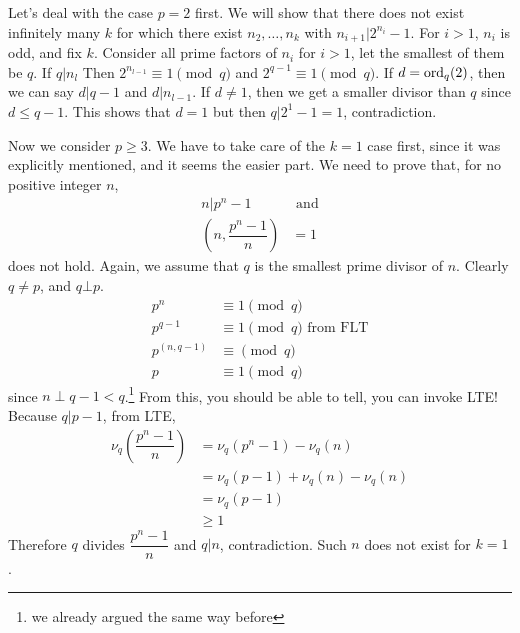 \documentclass[problems.tex]{subfile}
\begin{document}
	\begin{solution}
		Let's deal with the case $p=2$ first. We will show that there does not exist infinitely many $k$ for which there exist $n_2,\ldots,n_k$ with $n_{i+1}|2^{n_i}-1$. For $i>1$, $n_i$ is odd, and fix $k$. Consider all prime factors of $n_i$ for $i>1$, let the smallest of them be $q$. If $q|n_{l}$ Then $2^{n_{l-1}}\equiv1\pmod q$ and $2^{q-1}\equiv1\pmod q$. If $d=\operatorname{ord}_q(2)$, then we can say $d|q-1$ and $d|n_{l-1}$. If $d\neq1$, then we get a smaller divisor than $q$ since $d\leq q-1$. This shows that $d=1$ but then $q|2^1-1=1$, contradiction.
		
		Now we consider $p\geq3$. We have to take care of the $k=1$ case first, since it was explicitly mentioned, and it seems the easier part. We need to prove that, for no positive integer $n$,
			\begin{align*}
				n  |p^n-1 & \text{ and}\\
				\left(n,\dfrac{p^n-1}{n}\right) & = 1
			\end{align*}
		does not hold. Again, we assume that $q$ is the smallest prime divisor of $n$. Clearly $q\neq p$, and $q\bot p$.
			\begin{align*}
				p^n & \equiv1\pmod q\\
				p^{q-1}& \equiv1\pmod q\text{ from FLT}\\
				p^{(n,q-1)} & \equiv\pmod q\\
				p & \equiv1\pmod q
			\end{align*}
		since $n\perp q-1<q$.\footnote{we already argued the same way before} From this, you should be able to tell, you can invoke LTE! Because $q|p-1$, from LTE,
			\begin{align*}
				\nu_q\left(\dfrac{p^n-1}{n}\right)  & = \nu_q\left(p^n-1\right)-\nu_q(n)\\
													& = \nu_q(p-1)+\nu_q(n)-\nu_q(n)\\
													& = \nu_q(p-1)\\
													&\geq1
			\end{align*}
		Therefore $q$ divides $\dfrac{p^n-1}{n}$ and $q|n$, contradiction. Such $n$ does not exist for $k=1$.
		

\end{solution}
\end{document}
